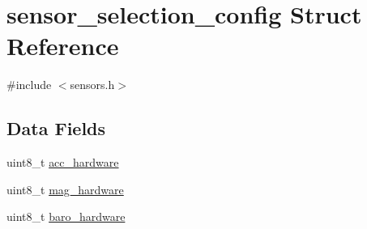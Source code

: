 \hypertarget{structsensor__selection__config}{\section{sensor\+\_\+selection\+\_\+config Struct Reference}
\label{structsensor__selection__config}
}


{\ttfamily \#include $<$sensors.\+h$>$}

\subsection*{Data Fields}
\begin{DoxyCompactItemize}
\item 
uint8\+\_\+t \hyperlink{structsensor__selection__config_a454ee9248c86e8f4072b5c595d6c86f4}{acc\+\_\+hardware}
\item 
uint8\+\_\+t \hyperlink{structsensor__selection__config_ac1fafe3ddd18d7cf451b2335a9f04b8b}{mag\+\_\+hardware}
\item 
uint8\+\_\+t \hyperlink{structsensor__selection__config_acf1cd0f3942afa3ac5420adbfdcb908e}{baro\+\_\+hardware}
\end{DoxyCompactItemize}


